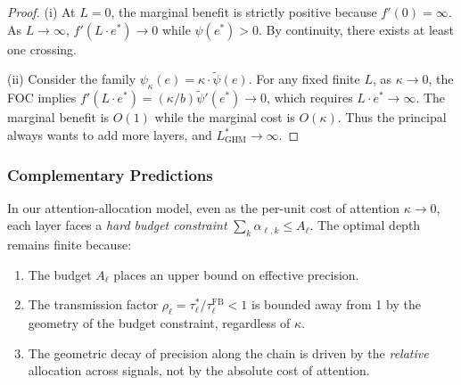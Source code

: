 \begin{proof}
(i) At $L = 0$, the marginal benefit is strictly positive because $f'(0) = \infty$. As $L \to \infty$, $f'(L \cdot e^*) \to 0$ while $\psi(e^*) > 0$. By continuity, there exists at least one crossing.

(ii) Consider the family $\psi_\kappa(e) = \kappa \cdot \tilde{\psi}(e)$. For any fixed finite $L$, as $\kappa \to 0$, the FOC implies $f'(L \cdot e^*) = (\kappa/b) \tilde{\psi}'(e^*) \to 0$, which requires $L \cdot e^* \to \infty$. The marginal benefit is $O(1)$ while the marginal cost is $O(\kappa)$. Thus the principal always wants to add more layers, and $L^*_{\text{GHM}} \to \infty$.
\end{proof}

\subsubsection{Complementary Predictions}

In our attention-allocation model, even as the per-unit cost of attention $\kappa \to 0$, each layer faces a \emph{hard budget constraint} $\sum_k \alpha_{\ell,k} \leq A_\ell$. The optimal depth remains finite because:
\begin{enumerate}[label=(\alph*)]
\item The budget $A_\ell$ places an upper bound on effective precision.
\item The transmission factor $\rho_\ell = \tau^*_\ell / \tau^{\text{FB}}_\ell < 1$ is bounded away from 1 by the geometry of the budget constraint, regardless of $\kappa$.
\item The geometric decay of precision along the chain is driven by the \emph{relative} allocation across signals, not by the absolute cost of attention.
\end{enumerate}

